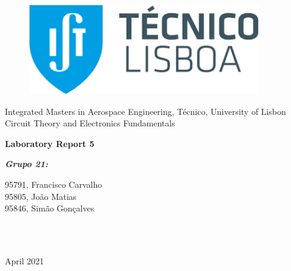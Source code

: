 \documentclass[11en, a4paper, oneside]{article}
\begin{document}
\begin{titlepage}
	\begin{center}
		\begin{figure}[htb!]
			\begin{center}
				\includegraphics[width=10cm]{../../figlib/tecnico.png}
			\end{center}
		\end{figure}
		
        \vspace{30pt}
        \begin{center}
        \Large{\center Integrated Masters in Aerospace Engineering, Técnico, University of Lisbon}\\
        \Large{\center Circuit Theory and Electronics Fundamentals}\\
        \end{center}
            
        \vspace{60pt}
        \Huge{\textbf{Laboratory Report 5}}
        
        \vspace{120pt}
        \begin{minipage}{0.4\textwidth}
		\begin{flushleft} \large
			\emph{\LARGE{\textbf{Grupo 21:}}}\par \vspace{10pt}
			95791, Francisco Carvalho \\ \vspace{20pt}
            95805, João Matias\\ \vspace{20pt}
            95846, Simão Gonçalves\\ \vspace{20pt}
		\end{flushleft}
	\end{minipage}
	~
	\begin{minipage}[b]{0.4\textwidth}
		\begin{flushright} \large
        	{}
		\end{flushright}
	\end{minipage}\\[2cm]
       \vspace{10pt}
        \large{April 2021}\\
	\end{center}
\end{titlepage}

\newpage
\renewcommand{\contentsname}{Índice}
\tableofcontents
\thispagestyle{empty}

\newpage
{}
\setcounter{page}{3}





\end{document}
